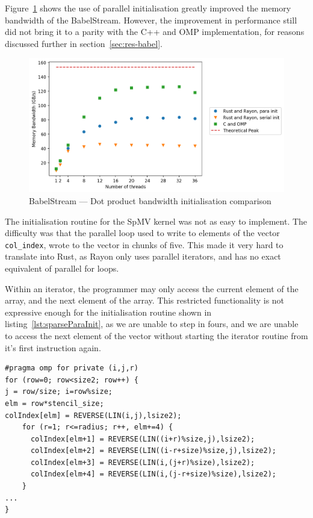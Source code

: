Figure~\ref{fig:babel-dot-init} shows the use of parallel initialisation greatly improved the memory bandwidth of the BabelStream. However, the improvement in performance still did not bring it to a parity with the C++ and OMP implementation, for reasons discussed further in section~\ref{sec:res-babel}.

\begin{figure}[H]
    \centering
    \includegraphics[width=.8\linewidth]{figs/babel/dot-init.png}
    \caption{BabelStream --- Dot product bandwidth initialisation comparison}
    \label{fig:babel-dot-init}
\end{figure}


The initialisation routine for the SpMV kernel was not as easy to implement. The difficulty was that the parallel loop used to write to elements of the vector \texttt{col\_index}, wrote to the vector in chunks of five. This made it very hard to translate into Rust, as Rayon only uses parallel iterators, and has no exact equivalent of parallel for loops.

Within an iterator, the programmer may only access the current element of the array, and the next element of the array. This restricted functionality is not expressive enough for the initialisation routine shown in listing~\ref{lst:sparseParaInit}, as we are unable to step in fours, and we are unable to access the next element of the vector without starting the iterator routine from it's first instruction again.


\begin{code}
\begin{verbatim}
#pragma omp for private (i,j,r)
for (row=0; row<size2; row++) {
j = row/size; i=row%size;
elm = row*stencil_size;
colIndex[elm] = REVERSE(LIN(i,j),lsize2);
    for (r=1; r<=radius; r++, elm+=4) {
      colIndex[elm+1] = REVERSE(LIN((i+r)%size,j),lsize2);
      colIndex[elm+2] = REVERSE(LIN((i-r+size)%size,j),lsize2);
      colIndex[elm+3] = REVERSE(LIN(i,(j+r)%size),lsize2);
      colIndex[elm+4] = REVERSE(LIN(i,(j-r+size)%size),lsize2);
    }
...
}
\end{verbatim}
\label{lst:sparseParaInit}
\end{code}

